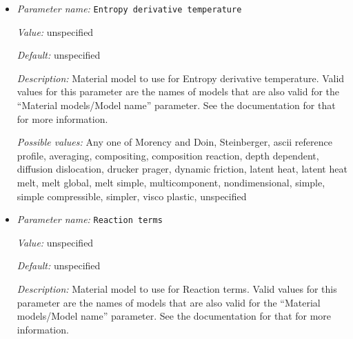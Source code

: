 \begin{itemize}
{\it Value:} unspecified


{\it Default:} unspecified


{\it Description:} Material model to use for Entropy derivative pressure. Valid values for this parameter are the names of models that are also valid for the ``Material models/Model name'' parameter. See the documentation for that for more information.


{\it Possible values:} Any one of Morency and Doin, Steinberger, ascii reference profile, averaging, compositing, composition reaction, depth dependent, diffusion dislocation, drucker prager, dynamic friction, latent heat, latent heat melt, melt global, melt simple, multicomponent, nondimensional, simple, simple compressible, simpler, visco plastic, unspecified
\item {\it Parameter name:} {\tt Entropy derivative temperature}
\label{parameters:Material model/Compositing/Entropy derivative temperature}


{\it Value:} unspecified


{\it Default:} unspecified


{\it Description:} Material model to use for Entropy derivative temperature. Valid values for this parameter are the names of models that are also valid for the ``Material models/Model name'' parameter. See the documentation for that for more information.


{\it Possible values:} Any one of Morency and Doin, Steinberger, ascii reference profile, averaging, compositing, composition reaction, depth dependent, diffusion dislocation, drucker prager, dynamic friction, latent heat, latent heat melt, melt global, melt simple, multicomponent, nondimensional, simple, simple compressible, simpler, visco plastic, unspecified
\item {\it Parameter name:} {\tt Reaction terms}
\label{parameters:Material model/Compositing/Reaction terms}


{\it Value:} unspecified


{\it Default:} unspecified


{\it Description:} Material model to use for Reaction terms. Valid values for this parameter are the names of models that are also valid for the ``Material models/Model name'' parameter. See the documentation for that for more information.



\end{itemize}
